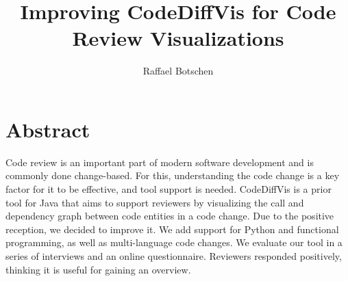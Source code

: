 \documentclass[a4paper,11pt,twoside]{article}
\theoremstyle{definition} %
\newcommand\covermatter{%
  \pagenumbering{Alph} %
  \pagestyle{empty} %
}
\newcommand\frontmatter{%
  \cleardoublepage
  \pagenumbering{roman}
  \pagestyle{plain} %
}
\begin{document}

\covermatter

\author{Raffael Botschen}

\title{Improving CodeDiffVis for Code Review Visualizations}



\maketitle

\frontmatter


{} %
\section*{Abstract}
Code review is an important part of modern software development and is commonly done change-based. For this, understanding the code change is a key factor for it to be effective, and tool support is needed. CodeDiffVis is a prior tool for Java that aims to support reviewers by visualizing the call and dependency graph between code entities in a code change. Due to the positive reception, we decided to improve it. We add support for Python and functional programming, as well as multi-language code changes. We evaluate our tool in a series of interviews and an online questionnaire. Reviewers responded positively, thinking it is useful for gaining an overview.
\newpage

{} %
\end{document}
